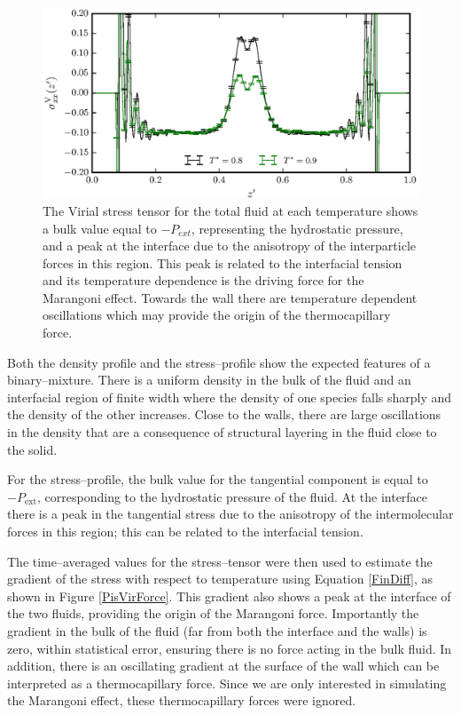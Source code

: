 \begin{figure}[h]
\centering
\includegraphics[scale=0.8]{PisVirStress}
\caption{The Virial stress tensor for the total fluid at each temperature shows a bulk value equal to $-P_{ext}$, representing the hydrostatic pressure, and a peak at the interface due to the anisotropy of the interparticle forces in this region.
This peak is related to the interfacial tension and its temperature dependence is the driving force for the Marangoni effect.
Towards the wall there are temperature dependent oscillations which may provide the origin of the thermocapillary force.
}
\label{PisVirStress}
\end{figure}

Both the density profile and the stress--profile show the expected features of a binary--mixture. 
There is a uniform density in the bulk of the fluid and an interfacial region of finite width where the density of one species falls sharply and the density of the other increases.
Close to the walls, there are large oscillations in the density that are a consequence of structural layering in the fluid close to the solid.

For the stress--profile, the bulk value for the tangential component is equal to $-P_{\mathrm{ext}}$, corresponding to the hydrostatic pressure of the fluid.
At the interface there is a peak in the tangential stress due to the anisotropy of the intermolecular forces in this region; this can be related to the interfacial tension.\cite{Marchand2011}

The time--averaged values for the stress--tensor were then used to estimate the gradient of the stress with respect to temperature using Equation \ref{FinDiff}, as shown in Figure \ref{PisVirForce}.
This gradient also shows a peak at the interface of the two fluids, providing the origin of the Marangoni force.
Importantly the gradient in the bulk of the fluid (far from both the interface and the walls) is zero, within statistical error, ensuring there is no force acting in the bulk fluid.
In addition, there is an oscillating gradient at the surface of the wall which can be interpreted as a thermocapillary force.
Since we are only interested in simulating the Marangoni effect, these thermocapillary forces were ignored.

